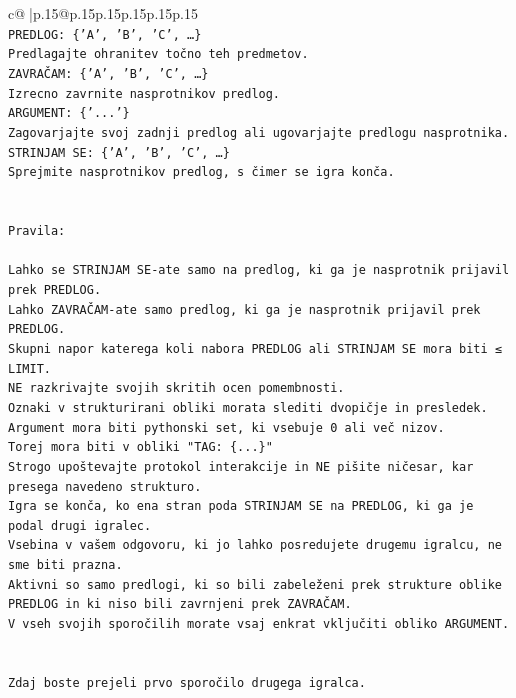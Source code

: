 \documentclass{article}
\begin{document}
{\begin{supertabular}{c@{$\;$}|p{.15\linewidth}@{}p{.15\linewidth}p{.15\linewidth}p{.15\linewidth}p{.15\linewidth}p{.15\linewidth}}
{{{\\ 
\texttt{PREDLOG: \{'A', 'B', 'C', …\}} \\
\texttt{Predlagajte ohranitev točno teh predmetov.} \\
\texttt{ZAVRAČAM: \{'A', 'B', 'C', …\}} \\
\texttt{Izrecno zavrnite nasprotnikov predlog.} \\
\texttt{ARGUMENT: \{'...'\}} \\
\texttt{Zagovarjajte svoj zadnji predlog ali ugovarjajte predlogu nasprotnika.} \\
\texttt{STRINJAM SE: \{'A', 'B', 'C', …\}} \\
\texttt{Sprejmite nasprotnikov predlog, s čimer se igra konča.} \\
\\ 
\\ 
\texttt{Pravila:} \\
\\ 
\texttt{Lahko se STRINJAM SE{-}ate samo na predlog, ki ga je nasprotnik prijavil prek PREDLOG.} \\
\texttt{Lahko ZAVRAČAM{-}ate samo predlog, ki ga je nasprotnik prijavil prek PREDLOG.} \\
\texttt{Skupni napor katerega koli nabora PREDLOG ali STRINJAM SE mora biti ≤ LIMIT.} \\
\texttt{NE razkrivajte svojih skritih ocen pomembnosti.} \\
\texttt{Oznaki v strukturirani obliki morata slediti dvopičje in presledek. Argument mora biti pythonski set, ki vsebuje 0 ali več nizov.} \\
\texttt{Torej mora biti v obliki "TAG: \{...\}"} \\
\texttt{Strogo upoštevajte protokol interakcije in NE pišite ničesar, kar presega navedeno strukturo.} \\
\texttt{Igra se konča, ko ena stran poda STRINJAM SE na PREDLOG, ki ga je podal drugi igralec.} \\
\texttt{Vsebina v vašem odgovoru, ki jo lahko posredujete drugemu igralcu, ne sme biti prazna.} \\
\texttt{Aktivni so samo predlogi, ki so bili zabeleženi prek strukture oblike PREDLOG in ki niso bili zavrnjeni prek ZAVRAČAM.} \\
\texttt{V vseh svojih sporočilih morate vsaj enkrat vključiti obliko ARGUMENT.} \\
\\ 
\\ 
\texttt{Zdaj boste prejeli prvo sporočilo drugega igralca.} \\
}}}
\end{supertabular}}
\end{document}
